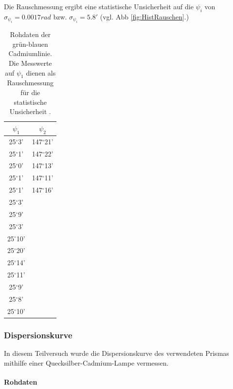 \documentclass[12pt,a4paper]{article}
\begin{document}
Die Rauschmessung ergibt eine statistische Unsicherheit auf die $\psi_i$ von $\sigma_{\psi_i} = 0.0017 rad$ bzw. $\sigma_{\psi_i} = 5.8'$ (vgl. Abb \ref{fig:HistRauschen}.)

\begin{table}
\begin{center}
\begin{tabular}{|c|c|}
\hline 
$\psi_1$ & $\psi_2$ \\ 
\hline 
25$^{\circ}$3' & 147$^{\circ}$21' \\ 
\hline 
25$^{\circ}$1' & 147$^{\circ}$22' \\ 
\hline 
25$^{\circ}$0'& 147$^{\circ}$13' \\ 
\hline 
25$^{\circ}$1' & 147$^{\circ}$11' \\ 
\hline 
25$^{\circ}$1' & 147$^{\circ}$16' \\ 
\hline 
25$^{\circ}$3' & \\ 
\hline 
25$^{\circ}$9' & \\ 
\hline 
25$^{\circ}$3' & \\ 
\hline 
25$^{\circ}$10' & \\ 
\hline 
25$^{\circ}$20' & \\ 
\hline 
25$^{\circ}$14' & \\ 
\hline 
25$^{\circ}$11' & \\ 
\hline 
25$^{\circ}$9' & \\ 
\hline 
25$^{\circ}$8' & \\ 
\hline 
25$^{\circ}$10' & \\ 
\hline 

\end{tabular} 

\caption{Rohdaten der grün-blauen Cadmiumlinie. Die Messwerte auf $\psi_1$ dienen als Rauschmessung für die statistische Unsicherheit .}
\label{tab:RauschenPrisma}
\end{center}
\end{table}


\subsubsection{Dispersionskurve}
In diesem Teilversuch wurde die Dispersionskurve des verwendeten Prismas mithilfe einer Quecksilber-Cadmium-Lampe vermessen.


\paragraph{Rohdaten}
\end{document}
